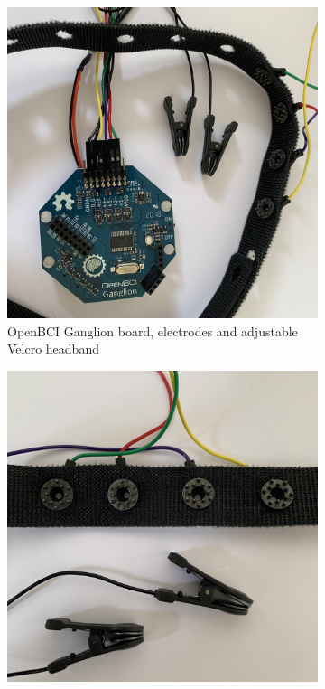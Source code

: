 \begin{figure}
     \begin{subfigure}[c]{0.45\textwidth}
         \centering
         \includegraphics[width=\textwidth]{openbci}
         \caption{OpenBCI Ganglion board, electrodes and adjustable Velcro headband}
         \label{fig:openbci}
     \end{subfigure}
     \hfill
    \begin{subfigure}[c]{0.45\textwidth}
         \centering
         \includegraphics[width=\textwidth]{openbci-electrodes}

\end{subfigure}
\end{figure}
